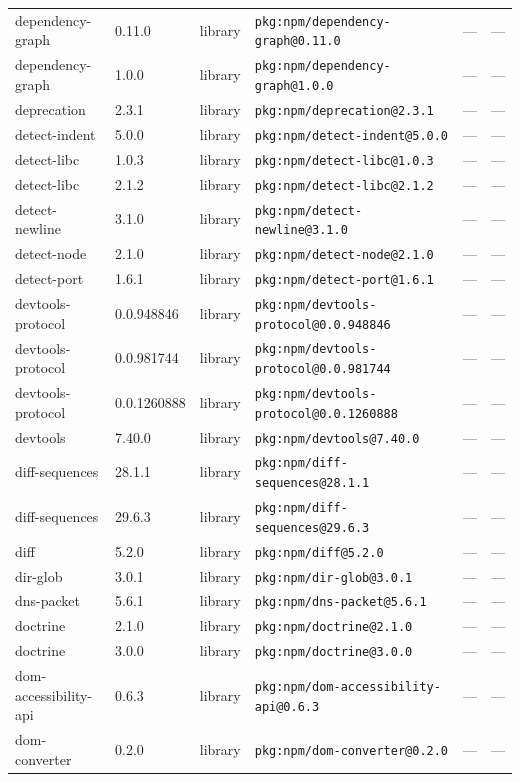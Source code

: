 \documentclass[11pt]{article}
\begin{document}
\begin{longtable}{|l|l|l|p{2.2cm}|l|p{4cm}|}
dependency-graph & 0.11.0 & library & \texttt{pkg:npm/dependency-graph@0.11.0} & — & — \\
dependency-graph & 1.0.0 & library & \texttt{pkg:npm/dependency-graph@1.0.0} & — & — \\
deprecation & 2.3.1 & library & \texttt{pkg:npm/deprecation@2.3.1} & — & — \\
detect-indent & 5.0.0 & library & \texttt{pkg:npm/detect-indent@5.0.0} & — & — \\
detect-libc & 1.0.3 & library & \texttt{pkg:npm/detect-libc@1.0.3} & — & — \\
detect-libc & 2.1.2 & library & \texttt{pkg:npm/detect-libc@2.1.2} & — & — \\
detect-newline & 3.1.0 & library & \texttt{pkg:npm/detect-newline@3.1.0} & — & — \\
detect-node & 2.1.0 & library & \texttt{pkg:npm/detect-node@2.1.0} & — & — \\
detect-port & 1.6.1 & library & \texttt{pkg:npm/detect-port@1.6.1} & — & — \\
devtools-protocol & 0.0.948846 & library & \texttt{pkg:npm/devtools-protocol@0.0.948846} & — & — \\
devtools-protocol & 0.0.981744 & library & \texttt{pkg:npm/devtools-protocol@0.0.981744} & — & — \\
devtools-protocol & 0.0.1260888 & library & \texttt{pkg:npm/devtools-protocol@0.0.1260888} & — & — \\
devtools & 7.40.0 & library & \texttt{pkg:npm/devtools@7.40.0} & — & — \\
diff-sequences & 28.1.1 & library & \texttt{pkg:npm/diff-sequences@28.1.1} & — & — \\
diff-sequences & 29.6.3 & library & \texttt{pkg:npm/diff-sequences@29.6.3} & — & — \\
diff & 5.2.0 & library & \texttt{pkg:npm/diff@5.2.0} & — & — \\
dir-glob & 3.0.1 & library & \texttt{pkg:npm/dir-glob@3.0.1} & — & — \\
dns-packet & 5.6.1 & library & \texttt{pkg:npm/dns-packet@5.6.1} & — & — \\
doctrine & 2.1.0 & library & \texttt{pkg:npm/doctrine@2.1.0} & — & — \\
doctrine & 3.0.0 & library & \texttt{pkg:npm/doctrine@3.0.0} & — & — \\
dom-accessibility-api & 0.6.3 & library & \texttt{pkg:npm/dom-accessibility-api@0.6.3} & — & — \\
dom-converter & 0.2.0 & library & \texttt{pkg:npm/dom-converter@0.2.0} & — & — \\

\end{longtable}
\end{document}
